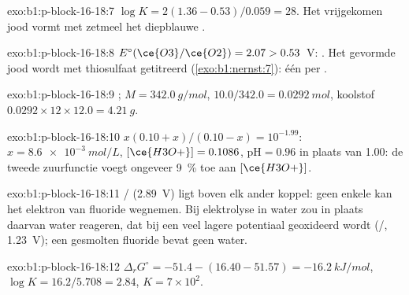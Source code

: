 \begin{solution}{exo:b1:p-block-16-18:7}
$\log K = 2(1.36 - 0.53)/0.059 = 28$. Het vrijgekomen jood vormt met
zetmeel het diepblauwe .
\end{solution}

\begin{solution}{exo:b1:p-block-16-18:8}
$E^\circ(\ce{O3}/\ce{O2}) = 2.07 > 0.53$~V: . Het gevormde jood wordt met thiosulfaat getitreerd
(\cref{exo:b1:nernst:7}): één  per .
\end{solution}

\begin{solution}{exo:b1:p-block-16-18:9}
; $M = \qty{342.0}{g/mol}$, $10.0/342.0 =
\qty{0.0292}{mol}$, koolstof $0.0292 \times 12 \times 12.0 = \qty{4.21}{g}$.
\end{solution}

\begin{solution}{exo:b1:p-block-16-18:10}
$x(0.10 + x)/(0.10 - x) = 10^{-1.99}$: $x = \qty{8.6e-3}{mol/L}$,
$[\ce{H3O+}] = 0.1086$, $\mathrm{pH} = 0.96$ in plaats van 1.00: de tweede
zuurfunctie voegt ongeveer \qty{9}{\percent} toe aan $[\ce{H3O+}]$.
\end{solution}

\begin{solution}{exo:b1:p-block-16-18:11}
/ (2.89~V) ligt boven elk ander koppel: geen enkele
 kan het elektron van fluoride wegnemen. Bij elektrolyse in water
zou in plaats daarvan water reageren, dat bij een veel lagere potentiaal
geoxideerd wordt (/, 1.23~V); een gesmolten fluoride bevat
geen water.
\end{solution}

\begin{solution}{exo:b1:p-block-16-18:12}
$\Delta_r G^\circ = -51.4 - (16.40 - 51.57) = \qty{-16.2}{kJ/mol}$,
$\log K = 16.2/5.708 = 2.84$, $K = 7 \times 10^2$.
\end{solution}

